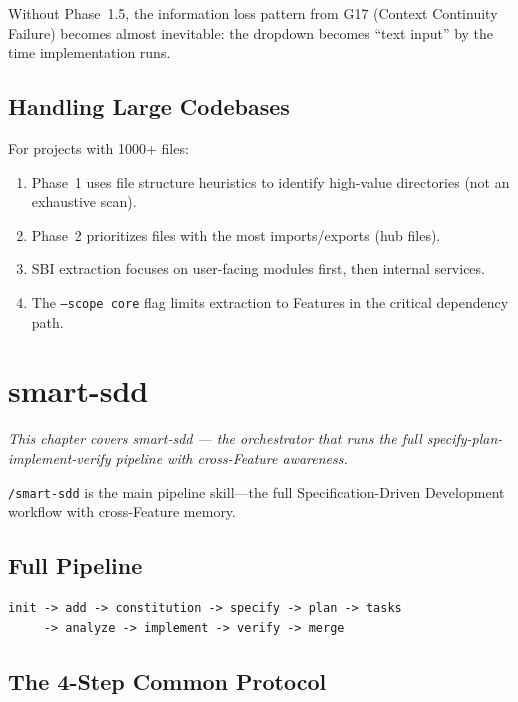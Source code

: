 \documentclass[11pt,a4paper,openright,twoside]{report}
\newcommand{\cmd}[1]{\texttt{/#1}}
\begin{document}
Without Phase~1.5, the information loss pattern from G17 (Context Continuity Failure) becomes almost inevitable: the dropdown becomes ``text input'' by the time implementation runs.

\section{Handling Large Codebases}

For projects with 1000+ files:

\begin{enumerate}
  \item Phase~1 uses file structure heuristics to identify high-value directories (not an exhaustive scan).
  \item Phase~2 prioritizes files with the most imports/exports (hub files).
  \item SBI extraction focuses on user-facing modules first, then internal services.
  \item The \texttt{--scope core} flag limits extraction to Features in the critical dependency path.
\end{enumerate}


\chapter{smart-sdd}
\label{ch:smart-sdd}

\textit{This chapter covers smart-sdd --- the orchestrator that runs the full specify-plan-implement-verify pipeline with cross-Feature awareness.}

\cmd{smart-sdd} is the main pipeline skill---the full Specification-Driven Development workflow with cross-Feature memory.

\section{Full Pipeline}

\begin{lstlisting}[title={Pipeline Steps}]
init -> add -> constitution -> specify -> plan -> tasks
     -> analyze -> implement -> verify -> merge
\end{lstlisting}

\section{The 4-Step Common Protocol}
\end{document}
